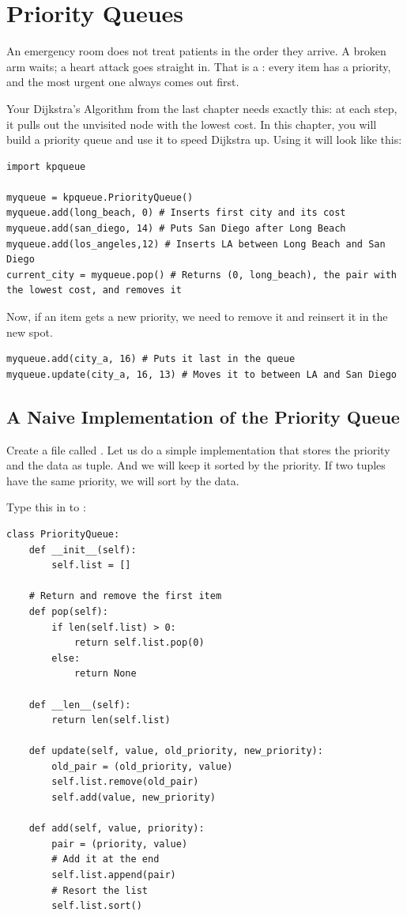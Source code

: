 \chapter{Priority Queues}

An emergency room does not treat patients in the order they arrive. A
broken arm waits; a heart attack goes straight in. That is a
: every item has a priority,
and the most urgent one always comes out first.

Your Dijkstra's Algorithm from the last chapter needs exactly this: at each
step, it pulls out the unvisited node with the lowest cost. In this
chapter, you will build a priority queue and use it to speed Dijkstra up. Using it will look like this:

\begin{verbatim}
import kpqueue

myqueue = kpqueue.PriorityQueue()
myqueue.add(long_beach, 0) # Inserts first city and its cost
myqueue.add(san_diego, 14) # Puts San Diego after Long Beach
myqueue.add(los_angeles,12) # Inserts LA between Long Beach and San Diego
current_city = myqueue.pop() # Returns (0, long_beach), the pair with the lowest cost, and removes it
\end{verbatim}

Now, if an item gets a new priority, we need to remove it and reinsert it in the new spot.
\begin{verbatim}
myqueue.add(city_a, 16) # Puts it last in the queue
myqueue.update(city_a, 16, 13) # Moves it to between LA and San Diego
\end{verbatim}

\section{A Naive Implementation of the Priority Queue}

Create a file called . Let us do a simple
implementation that stores the priority and the data as tuple. And we
will keep it sorted by the priority.  If two tuples have the same
priority, we will sort by the data.

Type this in to :
\begin{verbatim}
class PriorityQueue:
    def __init__(self):
        self.list = []

    # Return and remove the first item
    def pop(self):
        if len(self.list) > 0:
            return self.list.pop(0)
        else:
            return None

    def __len__(self):
        return len(self.list)

    def update(self, value, old_priority, new_priority):
        old_pair = (old_priority, value)
        self.list.remove(old_pair)
        self.add(value, new_priority)

    def add(self, value, priority):
        pair = (priority, value)
        # Add it at the end
        self.list.append(pair)
        # Resort the list
        self.list.sort()
\end{verbatim}

